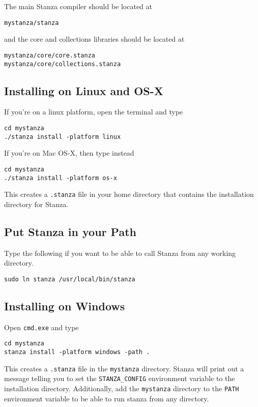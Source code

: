 \documentclass[10pt,oneside]{book}
\begin{document}
The main Stanza compiler should be located at
\begin{lstlisting}
mystanza/stanza
\end{lstlisting}

and the core and collections libraries should be located at
\begin{lstlisting}
mystanza/core/core.stanza
mystanza/core/collections.stanza
\end{lstlisting}

\subsection*{Installing on Linux and OS-X}
If you're on a linux platform, open the terminal and type
\begin{lstlisting}
cd mystanza
./stanza install -platform linux
\end{lstlisting}

If you're on Mac OS-X, then type instead
\begin{lstlisting}
cd mystanza
./stanza install -platform os-x
\end{lstlisting}

This creates a \texttt{\frenchspacing .stanza} file in your home directory that contains the installation directory for Stanza.

\subsection*{Put Stanza in your Path}
Type the following if you want to be able to call Stanza from any working directory.
\begin{lstlisting}
sudo ln stanza /usr/local/bin/stanza
\end{lstlisting}

\subsection*{Installing on Windows}
Open \texttt{\frenchspacing cmd.exe} and type
\begin{lstlisting}
cd mystanza
stanza install -platform windows -path .
\end{lstlisting}

This creates a \texttt{\frenchspacing .stanza} file in the \texttt{\frenchspacing mystanza} directory. Stanza will print out a message telling you to set the \texttt{\frenchspacing STANZA\_CONFIG} environment variable to the installation directory. Additionally, add the \texttt{\frenchspacing mystanza} directory to the \texttt{\frenchspacing PATH} environment variable to be able to run stanza from any directory.
\end{document}
